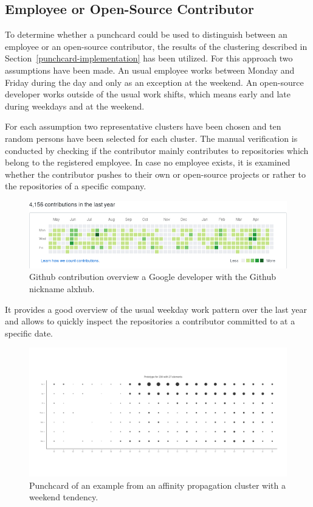 \subsection{Employee or Open-Source Contributor}
To determine whether a punchcard could be used to distinguish between an employee or an open-source contributor, the results of the clustering described in Section~\ref{punchcard-implementation} has been utilized.
For this approach two assumptions have been made.
An usual employee works between Monday and Friday during the day and only as an exception at the weekend.
An open-source developer works outside of the usual work shifts, which means early and late during weekdays and at the weekend.

For each assumption two representative clusters have been chosen and ten random persons have been selected for each cluster.
The manual verification is conducted by checking if the contributor mainly contributes to repositories which belong to the registered employee.
In case no employee exists, it is examined whether the contributor pushes to their own or open-source projects or rather to the repositories of a specific company.

\begin{figure}[H]
    \includegraphics[scale=0.6]{./graphs/contribution-overview-alxhub}
    \centering
    \caption{Github contribution overview a Google developer with the Github nickname alxhub.}\label{fig:random-sleep-rhythm}
\end{figure}

It provides a good overview of the usual weekday work pattern over the last year and allows to quickly inspect the repositories a contributor committed to at a specific date.

\begin{figure}[H]
    \includegraphics[scale=0.32]{./graphs/analysis-affinity/204}
    \centering
    \caption{Punchcard of an example from an affinity propagation cluster with a weekend tendency.}\label{fig:random-sleep-rhythm}
\end{figure}

